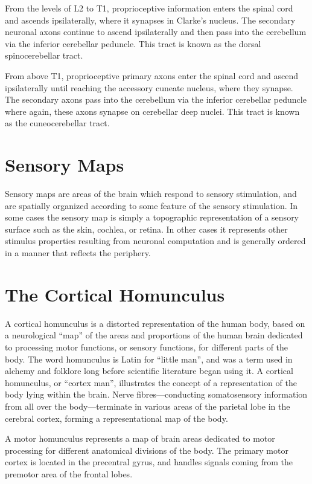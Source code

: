 \documentclass[]{book}
\begin{document}
From the levels of L2 to T1, proprioceptive information enters the spinal cord and ascends ipsilaterally, where it synapses in Clarke's nucleus. The secondary neuronal axons continue to ascend ipsilaterally and then pass into the cerebellum via the inferior cerebellar peduncle. This tract is known as the dorsal spinocerebellar tract.

From above T1, proprioceptive primary axons enter the spinal cord and ascend ipsilaterally until reaching the accessory cuneate nucleus, where they synapse. The secondary axons pass into the cerebellum via the inferior cerebellar peduncle where again, these axons synapse on cerebellar deep nuclei. This tract is known as the cuneocerebellar tract.

\hypertarget{sensory-maps}{%
\section{Sensory Maps}\label{sensory-maps}}

Sensory maps are areas of the brain which respond to sensory stimulation, and are spatially organized according to some feature of the sensory stimulation. In some cases the sensory map is simply a topographic representation of a sensory surface such as the skin, cochlea, or retina. In other cases it represents other stimulus properties resulting from neuronal computation and is generally ordered in a manner that reflects the periphery.

\hypertarget{the-cortical-homunculus}{%
\section{The Cortical Homunculus}\label{the-cortical-homunculus}}

A cortical homunculus is a distorted representation of the human body, based on a neurological ``map'' of the areas and proportions of the human brain dedicated to processing motor functions, or sensory functions, for different parts of the body. The word homunculus is Latin for ``little man'', and was a term used in alchemy and folklore long before scientific literature began using it. A cortical homunculus, or ``cortex man'', illustrates the concept of a representation of the body lying within the brain. Nerve fibres---conducting somatosensory information from all over the body---terminate in various areas of the parietal lobe in the cerebral cortex, forming a representational map of the body.

A motor homunculus represents a map of brain areas dedicated to motor processing for different anatomical divisions of the body. The primary motor cortex is located in the precentral gyrus, and handles signals coming from the premotor area of the frontal lobes.
\end{document}
